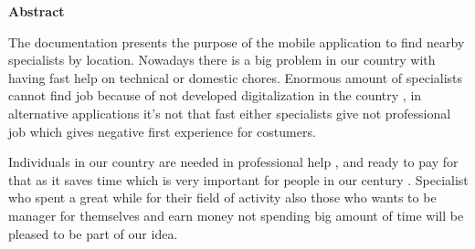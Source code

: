 \newpage
\pagestyle{plain}

\begin{center}
    \Large
    \textbf{Abstract}
\end{center}

The documentation presents the purpose of the mobile application to find nearby specialists by location. Nowadays there is a big problem in our country with having fast help on technical or domestic chores. Enormous amount of specialists cannot find job because of not developed digitalization in the country , in alternative applications it’s not that fast either specialists give not professional job which gives negative first experience for costumers.


Individuals in our country are needed in professional help , and ready to pay for that as it saves time which is very important for people in our century . Specialist who spent a great while for their field of activity also those who wants to be manager for themselves and earn money not spending big amount of time will be pleased to be part of our idea.
